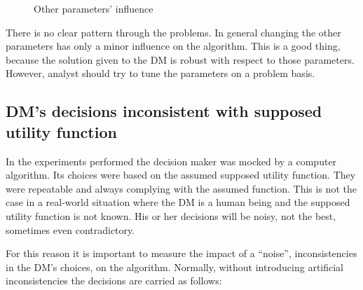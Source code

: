 \begin{figure}
{{    }
  }
  \caption{Other parameters' influence}
  \label{params2}
\end{figure}

There is no clear pattern through the problems. In general changing the other
parameters has only a minor influence on the algorithm. This is a good thing,
because the solution given to the DM is robust with respect to those
parameters. However, analyst should try to tune the parameters on a problem
basis.

\subsection{DM's decisions inconsistent with supposed utility function}
\label{dm-noise}


In the experiments performed the decision maker was mocked by a computer
algorithm. Its choices were based on the assumed supposed utility
function. They were repeatable and always complying with the assumed
function. This is not the case in a real-world situation where the DM is a
human being and the supposed utility function is not known. His or her
decisions will be noisy, not the best, sometimes even contradictory.

For this reason it is important to measure the impact of a ``noise'',
inconsistencies in the DM's choices, on the algorithm. Normally, without
introducing artificial inconsistencies the decisions are carried as follows:

